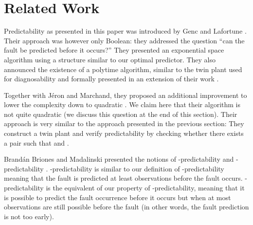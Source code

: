 \documentclass{article}
\begin{document}
\section{Related Work}
\label{sec::related}
Predictability as presented in this paper 
was introduced by Genc and Lafortune 
\cite{genc-lafortune::safeprocess::06}.  
Their approach was however only Boolean: 
they addressed the question 
``can the fault be predicted before it occurs?''  
They presented an exponential space algorithm 
using a structure similar to our optimal predictor.  
They also announced the existence of a polytime algorithm, 
similar to the twin plant used for diagnosability 
and formally presented in an extension of their work 
\cite{genc-lafortune::automatica::09}.  

Together with J\'eron and Marchand, 
they proposed an additional improvement to lower the complexity 
down to quadratic \cite{jeron-etal::wc::08}.  
We claim here that their algorithm is not quite quadratic 
(we discuss this question at the end of this section).  
Their approach is very similar to the approach presented 
in the previous section: 
They construct a twin plant and verify predictability 
by checking whether there exists a pair  
such that  and .  

Brand\'an Briones and Madalinski presented 
the notions of -predictability and -predictability 
\cite{brandanbriones-madalinski::sccc::11}.  
-predictability is similar to our definition of -predictability 
meaning that the fault is predicted at least  observations 
before the fault occurs.  
-predictability is the equivalent 
of our property of -predictability, 
meaning that it is possible to predict the fault occurrence 
before it occurs but when at most  observations 
are still possible before the fault 
(in other words, the fault prediction is not too early).  
\end{document}
